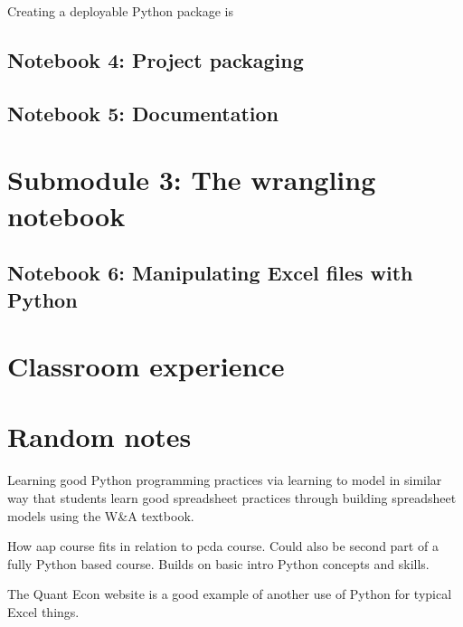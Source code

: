 \documentclass[ited,blindrev]{informs3}              %
\begin{document}
Creating a deployable Python package is 

\subsection{Notebook 4: Project packaging}
\subsection{Notebook 5: Documentation}

\section{Submodule 3: The wrangling notebook}
\subsection{Notebook 6: Manipulating Excel files with Python}

\section{Classroom experience}

\section{Random notes}
Learning good Python programming practices via learning to model in similar way that students learn good spreadsheet practices through building spreadsheet models using the W\&A textbook.

How aap course fits in relation to pcda course. Could also be second part of a fully Python based course. Builds on basic intro Python concepts and skills.

The Quant Econ website is a good example of another use of Python for typical Excel things.

\ACKNOWLEDGMENT{%
}%


%
%
%
\end{document}
